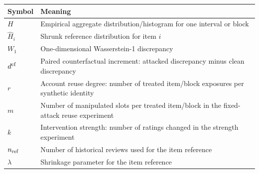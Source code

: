 \begin{tabular}{ll}
\toprule
Symbol & Meaning \\
\midrule
$H$ & Empirical aggregate distribution/histogram for one interval or block \\
$\widehat H_i$ & Shrunk reference distribution for item $i$ \\
$W_1$ & One-dimensional Wasserstein-1 discrepancy \\
$d^{\rm cf}$ & Paired counterfactual increment: attacked discrepancy minus clean discrepancy \\
$r$ & Account reuse degree: number of treated item/block exposures per synthetic identity \\
$m$ & Number of manipulated slots per treated item/block in the fixed-attack reuse experiment \\
$k$ & Intervention strength: number of ratings changed in the strength experiment \\
$n_{\rm ref}$ & Number of historical reviews used for the item reference \\
$\lambda$ & Shrinkage parameter for the item reference \\
\bottomrule
\end{tabular}
